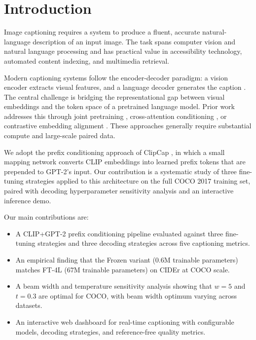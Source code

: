 \documentclass[conference]{IEEEtran}
\begin{document}
\section{Introduction}

Image captioning requires a system to produce a fluent, accurate natural-language description of an input image. The task spans computer vision and natural language processing and has practical value in accessibility technology, automated content indexing, and multimedia retrieval.

Modern captioning systems follow the encoder-decoder paradigm: a vision encoder extracts visual features, and a language decoder generates the caption \cite{vinyals2015show, xu2015show, anderson2018bottom}. The central challenge is bridging the representational gap between visual embeddings and the token space of a pretrained language model. Prior work addresses this through joint pretraining \cite{li2020oscar, zhou2020unified}, cross-attention conditioning \cite{alayrac2022flamingo}, or contrastive embedding alignment \cite{radford2021learning}. These approaches generally require substantial compute and large-scale paired data.

We adopt the prefix conditioning approach of ClipCap \cite{mokady2021clipcap}, in which a small mapping network converts CLIP embeddings into learned prefix tokens that are prepended to GPT-2's input. Our contribution is a systematic study of three fine-tuning strategies applied to this architecture on the full COCO 2017 training set, paired with decoding hyperparameter sensitivity analysis and an interactive inference demo.

Our main contributions are:
\begin{itemize}
\item A CLIP+GPT-2 prefix conditioning pipeline evaluated against three fine-tuning strategies and three decoding strategies across five captioning metrics.
\item An empirical finding that the Frozen variant (0.6M trainable parameters) matches FT-4L (67M trainable parameters) on CIDEr at COCO scale.
\item A beam width and temperature sensitivity analysis showing that $w=5$ and $t=0.3$ are optimal for COCO, with beam width optimum varying across datasets.
\item An interactive web dashboard for real-time captioning with configurable models, decoding strategies, and reference-free quality metrics.
\end{itemize}
\end{document}
